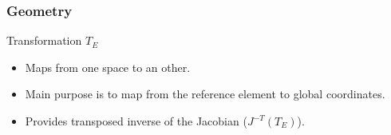 \documentclass[aspectratio=169,11pt]{beamer}
\theoremstyle{definition}
\begin{document}
\begin{frame}
  \frametitle{Geometry}

  Transformation $T_E$
  \begin{itemize}
  \item Maps from one space to an other.
  \item Main purpose is to map from the reference element to global coordinates.
  \item Provides transposed inverse of the Jacobian ($J^{-T}(T_E)$).
  \end{itemize}





\end{frame}
\end{document}

